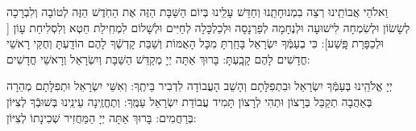 \documentclass[twoside, openany, parskip=half, 11pt]{book}
\begin{document}
\begin{sometimes}
 וֵאלֹהֵי אֲבוֹתֵֽינוּ רְצֵה בִמְנוּחָתֵֽנוּ וְחַדֵּשׁ עָלֵֽינוּ בְּיוֹם הַשַּׁבָּת הַזֶּה אֶת הַחֹֽדֶשׁ הַזֶּה לְטוֹבָה וְלִבְרָכָה לְשָׂשׂוֹן וּלְשִׂמְחָה לִישׁוּעָה וּלְנֶחָמָה לְפַרְנָסָה וּלְכַלְכָּלָה לְחַיִּים וּלְשָׁלוֹם לִמְחִֽילַת חֵטְא וְלִסְלִיחַת עָוֹן [
וּלְכַפָּרַת פָּֽשַׁע]: כִּי בְעַמְּֿךָ יִשְׂרָאֵל בָּחַֽרְתָּ מִכָּל הָאֻמּוֹת וְשַׁבַּת קָדְשְֿׁךָ לָהֶם הוֹדָֽעְתָּ וְחֻקֵּי רָאשֵׁי חֳדָשִׁים לָהֶם קָבָֽעְתָּ: בָּרוּךְ אַתָּה יְיָ מְקַדֵּשׁ הַשַּׁבָּת וְיִשְׂרָאֵל וְרָאשֵׁי חֳדָשִׁים: 

\end{sometimes}

 יְיָ אֱלֹהֵֽינוּ בְּעַמְּֿךָ יִשְׂרָאֵל וּבִתְפִלָּתָם וְהָשֵׁב הָעֲבוֹדָה לִדְבִיר בֵּיתֶֽךָ: וְאִשֵּׁי יִשְׂרָאֵל וּתְפִלָּתָם מְהֵרָה בְּאַהֲבָה תְקַבֵּל בְּרָצוֹן וּתְהִי לְרָצוֹן תָּמִיד עֲבוֹדַת יִשְׂרָאֵל עַמֶּֽךָ: וְתֶחֱזֶֽינָה עֵינֵֽינוּ בְּשׁוּבְֿךָ לְצִיּוֹן בְּרַחֲמִים: 
בָּרוּךְ אַתָּה יְיָ הַמַּחֲזִיר שְׁכִינָתוֹ לְצִיּוֹן:

\modim

\nextpage

\shabboschanukah

\shabboshodos

\vspace{.5\baselineskip}
\end{document}
